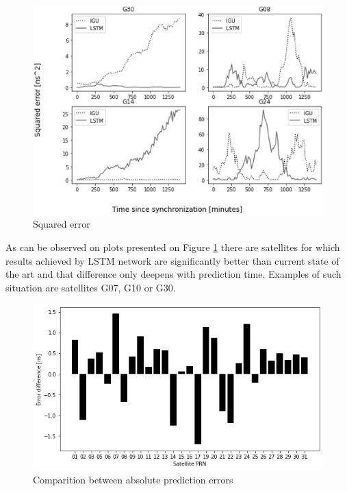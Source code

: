 \documentclass{kybernetika}
\begin{document}
\begin{figure}[htb] 
\centering
	\includegraphics[width=\textwidth]{figures/error_overwiev}
\caption{Squared error}
\label{fig:error_overview}
\end{figure}
As can be observed on plots presented on Figure \ref{fig:error_overview} there are satellites
for which results achieved by LSTM network are significantly better than current state of the
art and that difference only deepens with prediction time. Examples of such situation are
satellites G07, G10 or G30.
\begin{figure}[ht] 
\centering
	\includegraphics[width=\textwidth]{figures/error_diff}
\caption{Comparition between absolute prediction errors}
\label{fig:error_comparition}
\end{figure}
\end{document}
